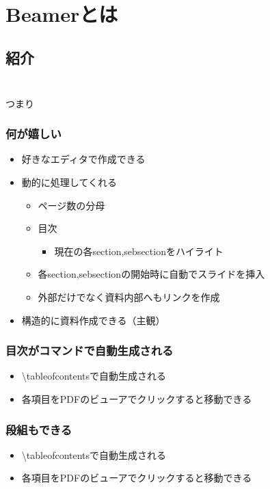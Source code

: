 \section{Beamerとは}
\subsection{紹介}
\begin{frame}
    \frametitle{\insertsection}
    \beameris
    \bigskip
    \\つまり
\end{frame}

\begin{frame}
    \frametitle{何が嬉しい}
    \begin{itemize}
        \item 好きなエディタで作成できる
        \item 動的に処理してくれる
        \begin{itemize}
            \item ページ数の分母
            \item 目次
            \begin{itemize}
                \item 現在の各section,sebsectionをハイライト
            \end{itemize}
            \item 各section,sebsectionの開始時に自動でスライドを挿入
            \item 外部だけでなく資料内部へもリンクを作成
        \end{itemize}
        \item 構造的に資料作成できる（主観）
    \end{itemize}
\end{frame}

\begin{frame}
  \frametitle{目次がコマンドで自動生成される}
  \tableofcontents
  \bigskip
  \footnotesize
  \begin{itemize}
      \item \textbackslash tableofcontentsで自動生成される
      \item 各項目をPDFのビューアでクリックすると移動できる
  \end{itemize}
\end{frame}

\begin{frame}
  \frametitle{段組もできる}
    \begin{multicols}{2}
      \tableofcontents[sections={1}]
      \bigskip
      \tableofcontents[sections={2}]
      \columnbreak
      \tableofcontents[sections={3}]
      \bigskip
      \tableofcontents[sections={4}]
    \end{multicols}
    \bigskip
    \footnotesize
    \begin{itemize}
        \item \textbackslash tableofcontentsで自動生成される
        \item 各項目をPDFのビューアでクリックすると移動できる
    \end{itemize}
\end{frame}

